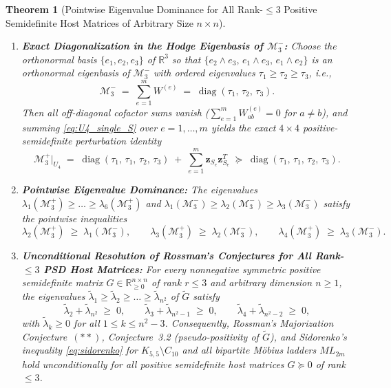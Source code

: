 \documentclass[11pt,a4paper]{article}
\theoremstyle{plain}
\newtheorem{theorem}{Theorem}[section]
\theoremstyle{definition}
\theoremstyle{remark}
\DeclareMathOperator{\diag}{diag}
\begin{document}
\begin{theorem}[Pointwise Eigenvalue Dominance for All Rank-$\le 3$ Positive Semidefinite Host Matrices of Arbitrary Size $n \times n$]
\begin{enumerate}[label=(\alph*)]
\begin{equation}
  \end{equation}
  \item \textbf{Exact Diagonalization in the Hodge Eigenbasis of $\mathcal{M}_3^-$:} Choose the orthonormal basis $\{e_1, e_2, e_3\}$ of $\mathbb{R}^3$ so that $\{e_2 \wedge e_3, \, e_1 \wedge e_3, \, e_1 \wedge e_2\}$ is an orthonormal eigenbasis of $\mathcal{M}_3^-$ with ordered eigenvalues $\tau_1 \ge \tau_2 \ge \tau_3$, i.e.,
  \[
    \mathcal{M}_3^- \;=\; \sum_{e=1}^m W^{(e)} \;=\; \diag(\tau_1, \, \tau_2, \, \tau_3).
  \]
  Then all off-diagonal cofactor sums vanish ($\sum_{e=1}^m W_{ab}^{(e)} = 0$ for $a \ne b$), and summing \eqref{eq:U4_single_S} over $e = 1,\dots,m$ yields the exact $4 \times 4$ positive-semidefinite perturbation identity
  \begin{equation}\label{eq:U4_diagonal_sos}
    \boxed{\mathcal{M}_3^+\big|_{U_4} \;=\; \diag(\tau_1, \, \tau_1, \, \tau_2, \, \tau_3) \;+\; \sum_{e=1}^m \mathbf{z}_{S_e} \mathbf{z}_{S_e}^T \;\succeq\; \diag(\tau_1, \, \tau_1, \, \tau_2, \, \tau_3).}
  \end{equation}
  \item \textbf{Pointwise Eigenvalue Dominance:} The eigenvalues $\lambda_1(\mathcal{M}_3^+) \ge \dots \ge \lambda_6(\mathcal{M}_3^+)$ and $\lambda_1(\mathcal{M}_3^-) \ge \lambda_2(\mathcal{M}_3^-) \ge \lambda_3(\mathcal{M}_3^-)$ satisfy the pointwise inequalities
  \begin{equation}\label{eq:pointwise_rank3}
    \lambda_2(\mathcal{M}_3^+) \;\ge\; \lambda_1(\mathcal{M}_3^-), \qquad
    \lambda_3(\mathcal{M}_3^+) \;\ge\; \lambda_2(\mathcal{M}_3^-), \qquad
    \lambda_4(\mathcal{M}_3^+) \;\ge\; \lambda_3(\mathcal{M}_3^-).
  \end{equation}
  \item \textbf{Unconditional Resolution of Rossman's Conjectures for All Rank-$\le 3$ PSD Host Matrices:} For every nonnegative symmetric positive semidefinite matrix $G \in \mathbb{R}_{\ge 0}^{n \times n}$ of rank $r \le 3$ and arbitrary dimension $n \ge 1$, the eigenvalues $\widetilde{\lambda}_1 \ge \widetilde{\lambda}_2 \ge \dots \ge \widetilde{\lambda}_{n^2}$ of $\widetilde{G}$ satisfy
  \begin{equation}\label{eq:Gtilde_pointwise_rank3}
    \widetilde{\lambda}_2 + \widetilde{\lambda}_{n^2} \;\ge\; 0, \qquad
    \widetilde{\lambda}_3 + \widetilde{\lambda}_{n^2-1} \;\ge\; 0, \qquad
    \widetilde{\lambda}_4 + \widetilde{\lambda}_{n^2-2} \;\ge\; 0,
  \end{equation}
  with $\widetilde{\lambda}_k \ge 0$ for all $1 \le k \le n^2 - 3$. Consequently, Rossman's Majorization Conjecture~$(**)$, Conjecture~3.2 (pseudo-positivity of $\widetilde{G}$), and Sidorenko's inequality \eqref{eq:sidorenko} for $K_{5,5} \setminus C_{10}$ and all bipartite M\"obius ladders $ML_{2m}$ hold unconditionally for all positive semidefinite host matrices $G \succeq 0$ of rank $\le 3$.
\end{enumerate}
\end{theorem}
\end{document}
